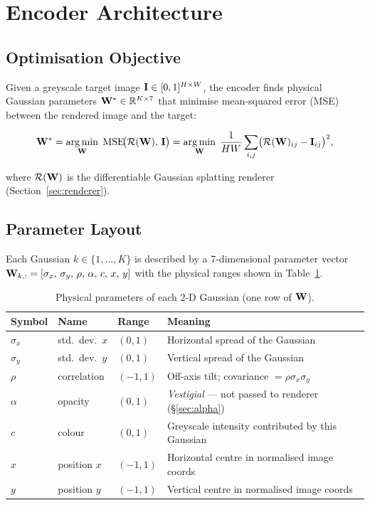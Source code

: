 \section{Encoder Architecture}
\label{sec:architecture}

\subsection{Optimisation Objective}

Given a greyscale target image $\mathbf{I} \in [0,1]^{H \times W}$, the encoder finds
physical Gaussian parameters $\mathbf{W}^* \in \mathbb{R}^{K \times 7}$ that minimise
mean-squared error (MSE) between the rendered image and the target:

\begin{equation}
  \mathbf{W}^* = \operatorname*{arg\,min}_{\mathbf{W}} \;\mathrm{MSE}\!\bigl(\mathcal{R}(\mathbf{W}),\, \mathbf{I}\bigr)
       = \operatorname*{arg\,min}_{\mathbf{W}} \;\frac{1}{HW}\sum_{i,j}
         \bigl(\mathcal{R}(\mathbf{W})_{ij} - \mathbf{I}_{ij}\bigr)^2,
  \label{eq:objective}
\end{equation}

\noindent where $\mathcal{R}(\mathbf{W})$ is the differentiable Gaussian splatting renderer
(Section~\ref{sec:renderer}).

\subsection{Parameter Layout}

Each Gaussian $k \in \{1,\ldots,K\}$ is described by a 7-dimensional parameter
vector $\mathbf{W}_{k,:} = [\sigma_x,\, \sigma_y,\, \rho,\, \alpha,\, c,\, x,\, y]$
with the physical ranges shown in Table~\ref{tab:params}.

\begin{table}[ht]
\centering
\caption{Physical parameters of each 2-D Gaussian (one row of $\mathbf{W}$).}
\label{tab:params}
\begin{tabular}{lllp{6.5cm}}
\toprule
\textbf{Symbol} & \textbf{Name} & \textbf{Range} & \textbf{Meaning} \\
\midrule
$\sigma_x$ & std.\ dev.\ $x$ & $(0, 1)$  & Horizontal spread of the Gaussian \\
$\sigma_y$ & std.\ dev.\ $y$ & $(0, 1)$  & Vertical spread of the Gaussian \\
$\rho$     & correlation     & $(-1, 1)$ & Off-axis tilt; covariance $= \rho\sigma_x\sigma_y$ \\
$\alpha$   & opacity         & $(0, 1)$  & \emph{Vestigial} — not passed to renderer (§\ref{sec:alpha}) \\
$c$        & colour          & $(0, 1)$  & Greyscale intensity contributed by this Gaussian \\
$x$        & position $x$    & $(-1, 1)$ & Horizontal centre in normalised image coords \\
$y$        & position $y$    & $(-1, 1)$ & Vertical centre in normalised image coords \\
\bottomrule
\end{tabular}
\end{table}

